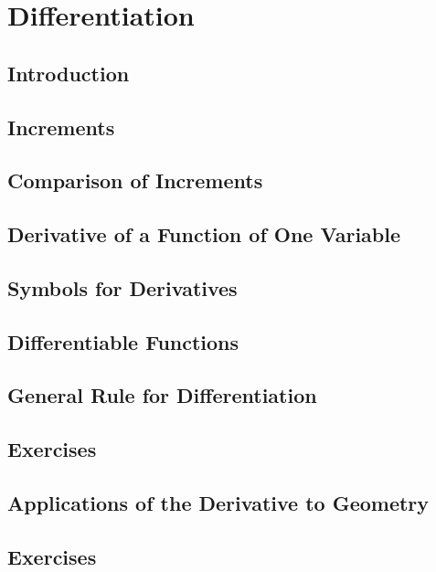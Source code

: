 \chapter{Differentiation}
\label{ch:04}

\section{Introduction}
\label{sec:04:01}

\section{Increments}
\label{sec:04:02}

\section{Comparison of Increments}
\label{sec:04:03}

\section{Derivative of a Function of One Variable}
\label{sec:04:04}

\section{Symbols for Derivatives}
\label{sec:04:05}

\section{Differentiable Functions}
\label{sec:04:06}

\section{General Rule for Differentiation}
\label{sec:04:07}

\section{Exercises}
\label{sec:04:08}

\section{Applications of the Derivative to Geometry}
\label{sec:04:09}

\section{Exercises}
\label{sec:04:10}

